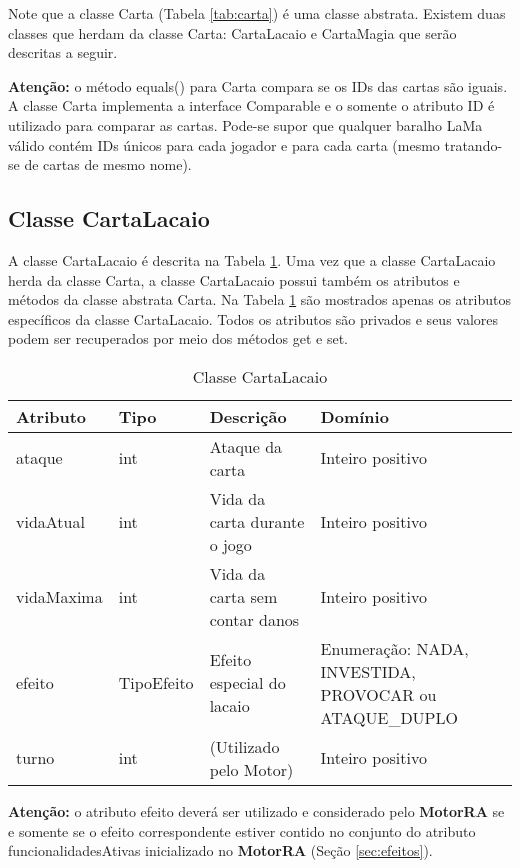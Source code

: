 \documentclass[10pt]{article}
\begin{document}
Note que a classe Carta (Tabela \ref{tab:carta}) é uma classe abstrata. Existem duas classes que herdam da classe Carta: CartaLacaio e CartaMagia que serão descritas a seguir.

\textbf{Atenção:} o método equals() para Carta compara se os IDs das cartas são iguais. A classe Carta implementa a interface Comparable e o somente o atributo ID é utilizado para comparar as cartas. Pode-se supor que qualquer baralho LaMa válido contém IDs únicos para cada jogador e para cada carta (mesmo tratando-se de cartas de mesmo nome).

\subsection{Classe CartaLacaio}

A classe CartaLacaio é descrita na Tabela \ref{tab:cartaLacaio}. Uma vez que a classe CartaLacaio herda da classe Carta, a classe CartaLacaio possui também os atributos e métodos da classe abstrata Carta. Na Tabela \ref{tab:cartaLacaio} são mostrados apenas os atributos específicos da classe CartaLacaio. Todos os atributos são privados e seus valores podem ser recuperados por meio dos métodos get e set. 


\renewcommand{\arraystretch}{1.15}
\begin{table}[h]
\centering
\caption{Classe CartaLacaio}
\label{tab:cartaLacaio}
\begin{tabular}{|l|l|p{5cm}|p{4cm}|}
\hline
Atributo & Tipo & Descrição & Domínio \\ \hline
ataque   & int       & Ataque da carta        & Inteiro positivo               \\ \hline
vidaAtual & int       & Vida da carta durante o jogo & Inteiro positivo                \\ \hline
vidaMaxima & int  & Vida da carta sem contar danos & Inteiro positivo                \\ \hline
efeito     & TipoEfeito & Efeito especial do lacaio & Enumeração: NADA, INVESTIDA, PROVOCAR ou ATAQUE\_DUPLO \\ \hline
turno     & int       & (Utilizado pelo Motor) & Inteiro positivo                \\ \hline
\end{tabular}
\end{table}

\textbf{Atenção:} o atributo efeito deverá ser utilizado e considerado pelo \textbf{MotorRA} se e somente se o efeito correspondente estiver contido no conjunto do atributo funcionalidadesAtivas inicializado no \textbf{MotorRA} (Seção \ref{sec:efeitos}).
\end{document}
